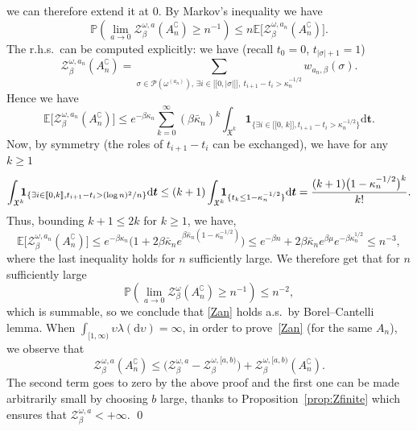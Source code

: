 \documentclass[JEP,XML,SOM,Unicode,published]{cedram}
\let\mathcal\mathscr
\newcommand{\lint}{\mathopen{[\![}}
\newcommand{\rint}{\mathclose{]\!]}}
\theoremstyle{definition}
\newcommand{\bt}{\boldsymbol{t}}
\newcommand{\dd}{\mathrm{d}}
\newcommand{\ind}{\mathbf{1}}
\let\cc\complement
\newcommand{\cP}{{\ensuremath{\mathcal P}} }
\newcommand{\cZ}{{\ensuremath{\mathcal Z}} }
\newcommand{\bbE}{{\ensuremath{\mathbb E}} }
\newcommand{\bbP}{{\ensuremath{\mathbb P}} }
\let\gb\beta
\let\gl\lambda
\let\ups\upsilon
\let\go\omega
\begin{document}
we can therefore extend it at $0$.
By Markov's inequality we have
\begin{equation}
\bbP\left(\lim_{a\to 0}\cZ^{\go, a}_{\beta}(A^{\cc}_{n})\ge n^{-1} \right) \le n \bbE \bigl[ \cZ^{\go,a_n}_{\beta}(A^{\cc}_{n}) \bigr].
\end{equation}
The r.h.s.\ can be computed explicitly: we have (recall $t_0=0$, $t_{|\sigma|+1}=1$)
\begin{equation*}
\cZ^{\go,a_n}_{\beta}(A^{\cc}_{n})= \sum_{\sigma \in \cP(\go^{(a_n)}),\, \exists i\in \lint 0, |\sigma|\rint, \ t_{i+1}-t_{i}> \kappa_n^{-1/2} } w_{a_n,\beta}(\sigma).
\end{equation*}
Hence we have
\begin{equation*}
\bbE \bigl[\cZ^{\go,a_n}_{\beta}(A^{\cc}_{n})\bigr]
\le e^{-\beta \kappa_{n}}\sum_{k=0}^{\infty} (\beta \bar \kappa_n)^k \int_{ \mathfrak{X}^k} \ind_{\{ \exists i\in \lint 0,\, k\rint, t_{i+1}-t_{i}> \kappa_n^{-1/2} \}} \dd \bt.
\end{equation*}
Now, by symmetry (the roles of $t_{i+1}-t_i$ can be exchanged), we have for any $k\ge 1$
\begin{equation*}
\int_{ \mathfrak{X}^k} \hspace*{-2mm}\ind_{\{ \exists i\in \lint 0, k\rint, t_{i+1}-t_{i}> (\log n)^2/n \}} \dd \bt \le (k+1) \int_{ \mathfrak{X}^k} \hspace*{-2mm}\ind_{\{ t_k\le 1- \kappa_n^{-1/2} \}} \dd \bt = \frac{ (k+1) \bigl(1- \kappa_n^{-1/2} \bigr)^k}{k!}.
\end{equation*}
Thus, bounding $k+1\leq 2 k$ for $k\geq 1$, we have,
\[
\bbE \bigl[\cZ^{\go,a_n}_{\beta}(A^{\cc}_{n})\bigr]
\le
e^{-\beta \kappa_{n}} \bigl(1+ 2\beta \bar \kappa_n e^{\gb \bar \kappa_n (1- \kappa_n^{-1/2}) } \bigr)
\le e^{-\beta n}+ 2\beta \bar \kappa_n e^{\beta \mu} e^{ -\gb \kappa_n^{1/2} }
\le n^{-3},
\]
where the last inequality holds for $n$ sufficiently large.
We therefore get that for $n$ sufficiently large\vspace*{-3pt}
\begin{equation}
\bbP\left(\lim_{a\to 0}\cZ^{\go}_{\beta}(A^{\cc}_{n})\ge n^{-1} \right) \le n^{-2},
\end{equation}
which is summable, so we conclude that \eqref{Zan} holds a.s.\ by Borel--Cantelli lemma.
When $\int_{[1,\infty)}\ups \gl (\dd \ups) =\infty$, in order to prove~\eqref{Zan} (for the same $A_n$),
we observe that\vspace*{-3pt}
\begin{equation}
\cZ^{\go,a}_{\beta}(A^{\cc}_{n})\le \bigl(\cZ^{\go,a}_{\beta}- \cZ^{\go,[a,b)}_{\beta} \bigr) + \cZ^{\go,[a,b)}_{\beta}(A^{\cc}_{n}).
\end{equation}
The second term goes to zero by the above proof and the first one can be made arbitrarily small by choosing $b$ large, thanks to Proposition~\ref{prop:Zfinite} which ensures that $\cZ_{\gb}^{\go,a}<+\infty$.
\qed
\end{document}

